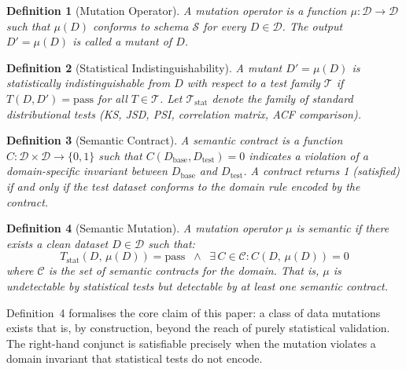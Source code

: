 \documentclass[journal]{IEEEtran}
\newtheorem{definition}{Definition}
\begin{document}
\begin{definition}[Mutation Operator]
A \emph{mutation operator} is a function $\mu : \mathcal{D}
\rightarrow \mathcal{D}$ such that $\mu(D)$ conforms to schema
$\mathcal{S}$ for every $D \in \mathcal{D}$. The output
$D' = \mu(D)$ is called a \emph{mutant} of $D$.
\end{definition}

\begin{definition}[Statistical Indistinguishability]
A mutant $D' = \mu(D)$ is \emph{statistically indistinguishable} from $D$
with respect to a test family $\mathcal{T}$ if
$T(D, D') = \mathrm{pass}$ for all $T \in \mathcal{T}$.  Let
$\mathcal{T}_{\mathrm{stat}}$ denote the family of standard distributional
tests (KS, JSD, PSI, correlation matrix, ACF comparison).
\end{definition}

\begin{definition}[Semantic Contract]
A \emph{semantic contract} is a function
$C : \mathcal{D} \times \mathcal{D} \rightarrow \{0, 1\}$ such that
$C(D_{\mathrm{base}}, D_{\mathrm{test}}) = 0$ indicates a violation of a
domain-specific invariant between $D_{\mathrm{base}}$ and
$D_{\mathrm{test}}$.  A contract returns 1 (satisfied) if and only if the
test dataset conforms to the domain rule encoded by the contract.
\end{definition}

\begin{definition}[Semantic Mutation]
\label{def:semantic_mutation}
A mutation operator $\mu$ is \emph{semantic} if there exists a clean dataset
$D \in \mathcal{D}$ such that:
\begin{equation}
T_{\mathrm{stat}}(D,\, \mu(D)) = \mathrm{pass}
\;\;\wedge\;\;
\exists\, C \in \mathcal{C} : C(D,\, \mu(D)) = 0
\label{eq:semantic_mutation}
\end{equation}
where $\mathcal{C}$ is the set of semantic contracts for the domain.
That is, $\mu$ is undetectable by statistical tests but detectable by at
least one semantic contract.
\end{definition}

Definition~4 formalises the core claim of this paper: a class
of data mutations exists that is, by construction, beyond the
reach of purely statistical validation.  The right-hand conjunct is
satisfiable precisely when the mutation violates a domain invariant that
statistical tests do not encode.
\end{document}
